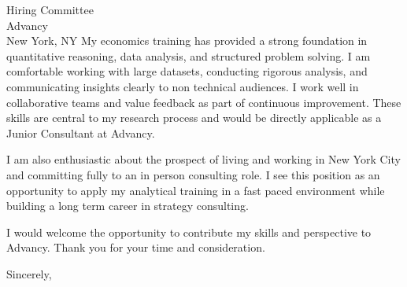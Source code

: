 \documentclass[11pt]{letter}
\begin{document}
\begin{letter}{Hiring Committee \\ Advancy \\ New York, NY}
My economics training has provided a strong foundation in quantitative reasoning, data analysis, and structured problem solving. I am comfortable working with large datasets, conducting rigorous analysis, and communicating insights clearly to non technical audiences. I work well in collaborative teams and value feedback as part of continuous improvement. These skills are central to my research process and would be directly applicable as a Junior Consultant at Advancy.

I am also enthusiastic about the prospect of living and working in New York City and committing fully to an in person consulting role. I see this position as an opportunity to apply my analytical training in a fast paced environment while building a long term career in strategy consulting.

I would welcome the opportunity to contribute my skills and perspective to Advancy. Thank you for your time and consideration.

\closing{Sincerely,}

\end{letter}
\end{document}
